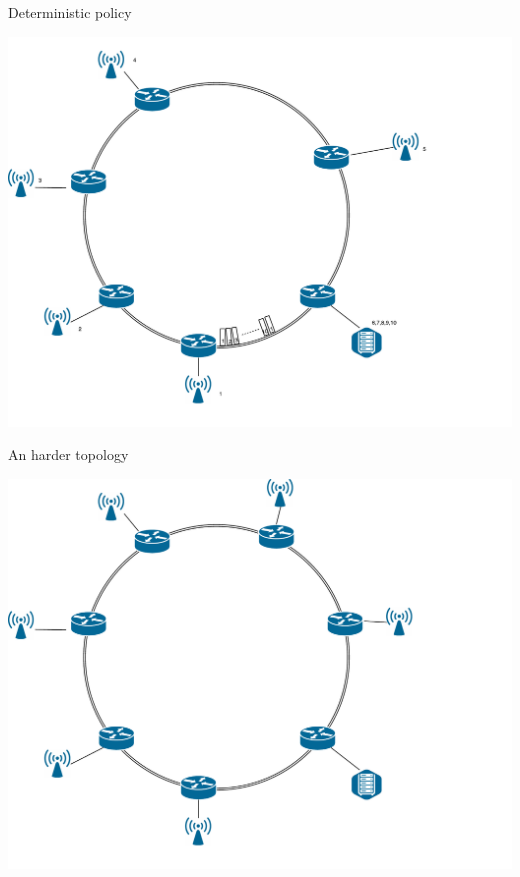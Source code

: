 \documentclass[10 pt]{beamer}
\begin{document}
\begin{frame}{Deterministic policy}

\hspace{2cm}
\includegraphics[scale=0.35]{slotsanneau.pdf}



\end{frame}



\begin{frame}{An harder topology}


\hspace{2cm}
\includegraphics[scale=0.35]{anneau_probleme.pdf}


\end{frame}
\end{document}
